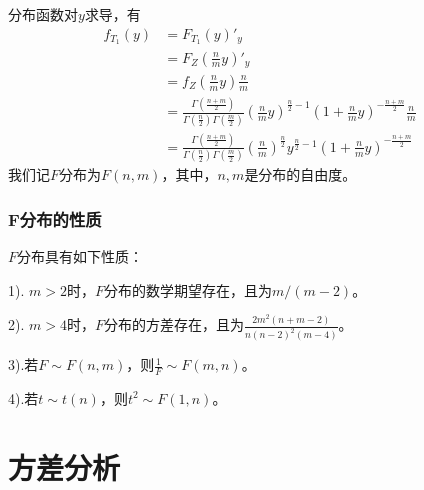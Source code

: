         分布函数对$y$求导，有
        \begin{align*}
        f_{T_1}(y) &= F_{T_1}(y)'_y\\
        &= F_Z\left(\frac{n}{m}y\right)'_y\\
        &=f_Z\left(\frac{n}{m}y\right)\frac{n}{m}\\
        &=\frac{\Gamma \left( \frac{n+m}{2} \right) }{\Gamma \left( \frac{n}{2} \right) \Gamma \left( \frac{m}{2} \right)} \left(\frac{n}{m}y\right)^{\frac{n}{2}-1}\left(1+\frac{n}{m}y\right)^{-\frac{n+m}{2}} \frac{n}{m}\\
        &=\frac{\Gamma \left( \frac{n+m}{2} \right) }{\Gamma \left( \frac{n}{2} \right) \Gamma \left( \frac{m}{2} \right)}\left(\frac{n}{m}\right)^{\frac{n}{2}}y^{\frac{n}{2}-1}\left(1+\frac{n}{m}y\right)^{-\frac{n+m}{2}}
        \end{align*}
        我们记$F$分布为$F(n,m)$，其中，$n,m$是分布的自由度。

        \subsubsection{F分布的性质}
            $F$分布具有如下性质：
            \par
            1). $m>2$时，$F$分布的数学期望存在，且为$m/(m-2)$。
            \par
            2). $m>4$时，$F$分布的方差存在，且为$\frac{2m^2(n+m-2)}{n(n-2)^2(m-4)}$。
            \par
            3).若$F\sim F(n,m)$，则$\frac{1}{F}\sim F(m,n)$。
            \par
            4).若$t\sim t(n)$，则$t^2\sim F(1,n)$。

\section{方差分析}
